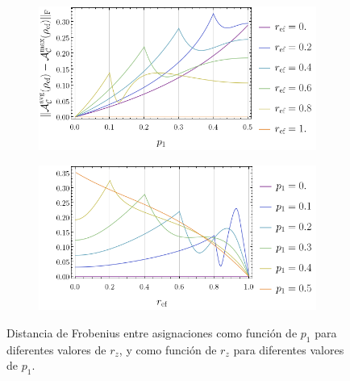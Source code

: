\begin{figure}[ht!]
    \centering
    \begin{subfigure}{0.5\textwidth}
      \centering
      \includegraphics[width=1.\linewidth]{appendices/figures/dist_maxent_avg_vs_p.png}
    \end{subfigure}%
    \begin{subfigure}{0.5\textwidth}
      \centering
      \includegraphics[width=1.\linewidth]{appendices/figures/dist_maxent_avg_vs_z.png}
    \end{subfigure}
    \caption{Distancia de Frobenius entre asignaciones como función de $p_{1}$ para diferentes valores de $r_{z}$, y como función de $r_{z}$ para diferentes valores de $p_{1}$.}\label{ap:DistAvgMaxEnt}
\end{figure}

